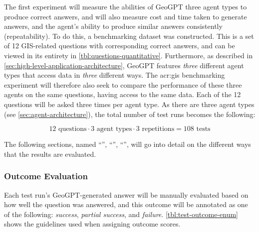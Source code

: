 The first experiment will measure the abilities of GeoGPT three agent types to produce correct answers, and will also measure cost and time taken to generate answers, and the agent's ability to produce similar answers consistently (repeatability). To do this, a benchmarking dataset was constructed. This is a set of 12 GIS-related questions with corresponding correct answers, and can be viewed in its entirety in \autoref{tbl:questions-quantitative}. Furthermore, as described in \autoref{sec:high-level-application-architecture}, GeoGPT features \textit{three} different agent types that access data in \textit{three} different ways. The \acrshort{acr:gis} benchmarking experiment will therefore also seek to compare the performance of these three agents on the same questions, having access to the same data. Each of the 12 questions will be asked three times per agent type. As there are three agent types (see \autoref{sec:agent-architecture}), the total number of test runs becomes the following:

$$12 \text{ questions} \cdot 3 \text{ agent types} \cdot 3 \text{ repetitions} = 108 \text{ tests}$$

The following sections, named \enquote{}, \enquote{}, \enquote{}, will go into detail on the different ways that the results are evaluated.

\subsubsection{Outcome Evaluation}
\label{subsubsec:outcome-evaluation}

Each test run's GeoGPT-generated answer will be manually evaluated based on how well the question was answered, and this outcome will be annotated as one of the following: \textit{success}, \textit{partial success}, and \textit{failure}. \autoref{tbl:test-outcome-enum} shows the guidelines used when assigning outcome scores.

